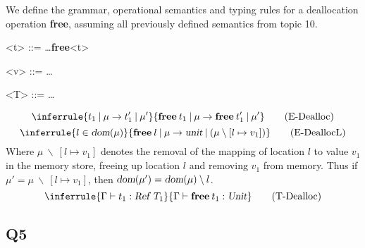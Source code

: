 \documentclass[12pt, fleqn]{article}
\begin{document}
We define the grammar, operational semantics and typing rules for a deallocation operation \textbf{free}, assuming all previously defined semantics from topic 10.

\begin{grammar}
    <t> ::= \dots \alt \textbf{free}\:<t>

    <v> ::= \dots

    <T> ::= \dots
\end{grammar}

\begin{equation}
    \inferrule{t_1\:|\:\mu \rightarrow t_1'\:|\:\mu' }{ \textbf{free}\:t_1\:|\:\mu \rightarrow \textbf{free}\:t_1'\:|\:\mu' } \tag{E-Dealloc}
\end{equation}
\begin{equation}
    \inferrule{ l \in \textsl{dom}(\mu) }{ \textbf{free}\:l\:|\:\mu \rightarrow \textsl{unit}\:|\:(\mu\: \backslash\:[l \mapsto v_1]) } \tag{E-DeallocL}
\end{equation}
Where $\mu\: \backslash\:[l \mapsto v_1]$ denotes the removal of the mapping of location $l$ to value $v_1$ in the memory store, freeing up location $l$ and removing $v_1$ from memory. Thus if $\mu' = \mu\: \backslash\:[l \mapsto v_1]$, then $\textsl{dom}(\mu') = \textsl{dom}(\mu)\:\backslash\:l$.
\begin{equation}
    \inferrule{ \Gamma \vdash t_1 : \textsl{Ref}\:\:T_1 }{ \Gamma \vdash \textbf{free}\:t_1 : \textsl{Unit} } \tag{T-Dealloc}
\end{equation}

\subsection{Q5}

\end{document}
